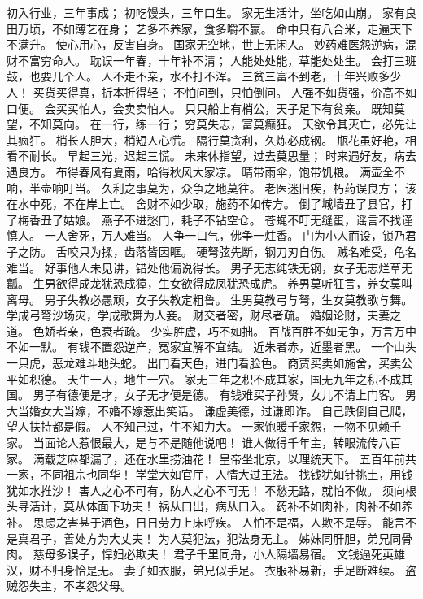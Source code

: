 \documentclass[12pt,UTF8]{ctexbook}
\begin{document}
初入行业，三年事成；
初吃馒头，三年口生。
家无生活计，坐吃如山崩。
家有良田万顷，不如薄艺在身；
艺多不养家，食多嚼不赢。
命中只有八合米，走遍天下不满升。
使心用心，反害自身。
国家无空地，世上无闲人。
妙药难医怨逆病，混财不富穷命人。
耽误一年春，十年补不清；
人能处处能，草能处处生。
会打三班鼓，也要几个人。
人不走不亲，水不打不浑。
三贫三富不到老，十年兴败多少人！
买货买得真，折本折得轻；
不怕问到，只怕倒问。
人强不如货强，价高不如口便。
会买买怕人，会卖卖怕人。
只只船上有梢公，天子足下有贫亲。
既知莫望，不知莫向。
在一行，练一行；
穷莫失志，富莫癫狂。
天欲令其灭亡，必先让其疯狂。
梢长人胆大，梢短人心慌。
隔行莫贪利，久炼必成钢。
瓶花虽好艳，相看不耐长。
早起三光，迟起三慌。
未来休指望，过去莫思量；
时来遇好友，病去遇良方。
布得春风有夏雨，哈得秋风大家凉。
晴带雨伞，饱带饥粮。
满壶全不响，半壶响叮当。
久利之事莫为，众争之地莫往。
老医迷旧疾，朽药误良方；
该在水中死，不在岸上亡。
舍财不如少取，施药不如传方。
倒了城墙丑了县官，打了梅香丑了姑娘。
燕子不进愁门，耗子不钻空仓。
苍蝇不叮无缝蛋，谣言不找谨慎人。
一人舍死，万人难当。
人争一口气，佛争一炷香。
门为小人而设，锁乃君子之防。
舌咬只为揉，齿落皆因眶。
硬弩弦先断，钢刀刃自伤。
贼名难受，龟名难当。
好事他人未见讲，错处他偏说得长。
男子无志纯铁无钢，女子无志烂草无瓤。
生男欲得成龙犹恐成獐，生女欲得成凤犹恐成虎。
养男莫听狂言，养女莫叫离母。
男子失教必愚顽，女子失教定粗鲁。
生男莫教弓与弩，生女莫教歌与舞。
学成弓弩沙场灾，学成歌舞为人妾。
财交者密，财尽者疏。
婚姻论财，夫妻之道。
色娇者亲，色衰者疏。
少实胜虚，巧不如拙。
百战百胜不如无争，万言万中不如一默。
有钱不置怨逆产，冤家宜解不宜结。
近朱者赤，近墨者黑。
一个山头一只虎，恶龙难斗地头蛇。
出门看天色，进门看脸色。
商贾买卖如施舍，买卖公平如积德。
天生一人，地生一穴。
家无三年之积不成其家，国无九年之积不成其国。
男子有德便是才，女子无才便是德。
有钱难买子孙贤，女儿不请上门客。
男大当婚女大当嫁，不婚不嫁惹出笑话。
谦虚美德，过谦即诈。
自己跌倒自己爬，望人扶持都是假。
人不知己过，牛不知力大。
一家饱暖千家怨，一物不见赖千家。
当面论人惹恨最大，是与不是随他说吧！
谁人做得千年主，转眼流传八百家。
满载芝麻都漏了，还在水里捞油花！
皇帝坐北京，以理统天下。
五百年前共一家，不同祖宗也同华！
学堂大如官厅，人情大过王法。
找钱犹如针挑土，用钱犹如水推沙！
害人之心不可有，防人之心不可无！
不愁无路，就怕不做。
须向根头寻活计，莫从体面下功夫！
祸从口出，病从口入。
药补不如肉补，肉补不如养补。
思虑之害甚于酒色，日日劳力上床呼疾。
人怕不是福，人欺不是辱。
能言不是真君子，善处方为大丈夫！
为人莫犯法，犯法身无主。
姊妹同肝胆，弟兄同骨肉。
慈母多误子，悍妇必欺夫！
君子千里同舟，小人隔墙易宿。
文钱逼死英雄汉，财不归身恰是无。
妻子如衣服，弟兄似手足。
衣服补易新，手足断难续。
盗贼怨失主，不孝怨父母。
\end{document}
